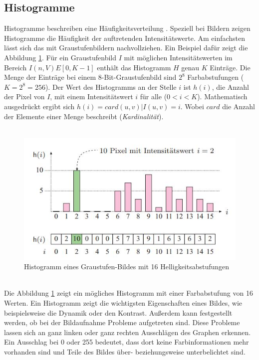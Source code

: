 \subsection{Histogramme}\label{s.histogramme}
Histogramme beschreiben eine Häufigkeitsverteilung \cite[42ff.]{burger2009digitale}. Speziell bei Bildern zeigen Histogramme die Häufigkeit der auftretenden Intensitätswerte. Am einfachsten lässt sich das mit Graustufenbildern nachvollziehen. Ein Beispiel dafür zeigt die Abbildung \ref{img:histogramm}. Für ein Graustufenbild $I$ mit möglichen Intensitätswerten im Bereich $I(n,V)E[0,K-1]$ enthält das Histogramm $H$ genau $K$ Einträge. Die Menge der Einträge bei einem 8-Bit-Graustufenbild sind $2^8$ Farbabstufungen ($K=2^8=256$). Der Wert des Histogramms an der Stelle $i$ ist $h(i)$, die Anzahl der Pixel von $I$, mit einem Intensitätswert $i$ für alle ($0<i<K$). Mathematisch ausgedrückt ergibt sich
 $h(i)=card{(u,v) | I(u,v)=i}$. %
 Wobei $card$ die Anzahl der Elemente einer Menge beschreibt (\textit{Kardinalität}).\\\\
  \begin{figure}
    [h]
    \centering
    \includegraphics[scale=0.8]{Sources/histogramm.jpg}
    \caption{Histogramm eines Graustufen-Bildes mit 16 Helligkeitsabstufungen \cite[42]{burger2009digitale}}
    \label{img:histogramm}
  \end{figure}\\
Die Abbildung \ref{img:histogramm} zeigt ein mögliches Histogramm mit einer Farbabstufung von 16 Werten. Ein Histogramm zeigt die wichtigsten Eigenschaften eines Bildes, wie beispielsweise die Dynamik oder den Kontrast. Außerdem kann festgestellt werden, ob bei der Bildaufnahme Probleme aufgetreten sind. Diese Probleme lassen sich an ganz linken oder ganz rechten Ausschlägen des Graphen erkennen. Ein Ausschlag bei 0 oder 255 bedeutet, dass dort keine Farbinformationen mehr vorhanden sind und Teile des Bildes über- beziehungsweise unterbelichtet sind.\\\\

